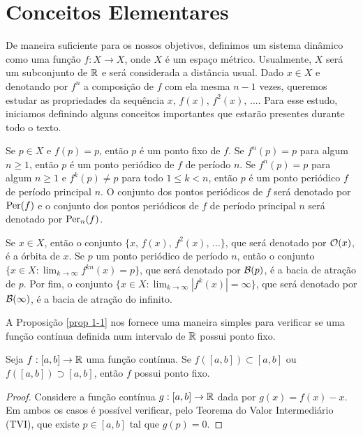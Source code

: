 \section{Conceitos Elementares}

De maneira suficiente para os nossos objetivos, definimos um sistema dinâmico como uma função $f: X \to X$, onde $X$ é um espaço métrico.
Usualmente, $X$ será um subconjunto de $\mathbb{R}$ e será considerada a distância usual.
Dado $x \in X$ e denotando por $f^n$ a composição de $f$ com ela mesma $n-1$ vezes, queremos estudar as propriedades da sequência $x, \, f(x), \, f^2(x), \, \dots$.
Para esse estudo, iniciamos definindo alguns conceitos importantes que estarão presentes durante todo o texto.

Se $p \in X$ e $f(p) = p$, então $p$ é um ponto fixo de $f$.
Se $f^n(p) = p$ para algum $n \geq 1$, então $p$ é um ponto periódico de $f$ de período $n$.
Se $f^n(p) = p$ para algum $n \geq 1$ e $f^k(p) \neq p$ para todo $1 \leq k < n$, então $p$ é um ponto periódico $f$ de período principal $n$.
O conjunto dos pontos periódicos de $f$ será denotado por $\operatorname{Per}(f)$ e o conjunto dos pontos periódicos de $f$ de período principal $n$ será denotado por $\operatorname{Per}_n(f)$.

Se $x \in X$, então o conjunto $\lbrace x, \, f(x), \, f^2(x), \, \dots \rbrace$, que será denotado por $\mathcal{O}(x)$, é a órbita de $x$.
Se $p$ um ponto periódico de período $n$, então o conjunto $\lbrace x \in  X: \lim_{k \to \infty} f^{kn}(x) = p \rbrace$, que será denotado por $\mathcal{B}(p)$, é a bacia de atração de $p$. Por fim, o conjunto $\lbrace x \in  X: \lim_{k \to \infty} |f^k(x)| = \infty \rbrace$, que será denotado por $\mathcal{B}(\infty)$, é a bacia de atração do infinito.

A Proposição \ref{prop 1-1} nos fornece uma maneira simples para verificar se uma função contínua definida num intervalo de $\mathbb{R}$ possui ponto fixo.

\begin{proposition}\label{prop 1-1}
Seja $f: [a, b] \to \mathbb{R}$ uma função contínua. Se $f([a, b]) \subset [a, b]$ ou $f([a, b]) \supset [a, b]$, então $f$ possui ponto fixo.
\end{proposition}

\begin{proof}
Considere a função contínua $g: [a, b] \to \mathbb{R}$ dada por $g(x) = f(x) - x$. Em ambos os casos é possível verificar, pelo Teorema do Valor Intermediário (TVI), que existe $p \in [a, b]$ tal que $g(p) = 0$.
\end{proof}

